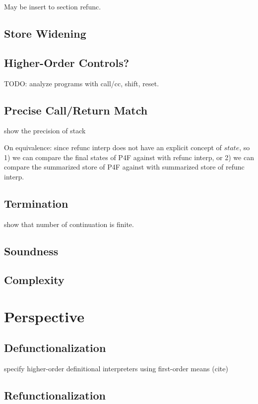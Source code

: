 \documentclass[acmsmall,review,anonymous]{acmart}\settopmatter{printfolios=true,printccs=false,printacmref=false}
\begin{document}
May be insert to section refunc.

\subsection{Store Widening}

\subsection{Higher-Order Controls?}

TODO: analyze programs with call/cc, shift, reset.

\subsection{Precise Call/Return Match}

show the precision of stack

On equivalence: since refunc interp does not have an explicit concept of $state$,
so 1) we can compare the final states of P4F against with refunc interp,
or 2) we can compare the summarized store of P4F against with summarized store of refunc interp.

\subsection{Termination}

show that number of continuation is finite.

\subsection{Soundness}

\subsection{Complexity}

\section{Perspective}

\subsection{Defunctionalization}

specify higher-order definitional interpreters using first-order means (cite)

\subsection{Refunctionalization}
\end{document}
